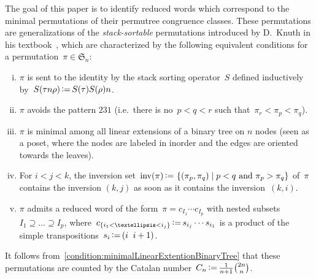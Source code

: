 \documentclass[11pt]{article}
\theoremstyle{definition}
\providecommand{\ie}{i.e.\ }
\numberwithin{equation}{section}
\newcommand{\fS}{\mathfrak{S}}
\newcommand{\set}[2]{\left\{ #1 \;\middle|\; #2 \right\}}
\newcommand{\eqdef}{\mbox{\,\raisebox{0.2ex}{\scriptsize\ensuremath{\mathrm:}}\ensuremath{=}\,}}
\newcommand{\defn}[1]{\textsl{\color{darkblue} #1}}
\DeclareMathOperator{\inv}{inv}
\begin{document}
The goal of this paper is to identify reduced words which correspond to the minimal permutations of their permutree congruence classes.
These permutations are generalizations of the \defn{stack-sortable} permutations introduced by D.~Knuth in his textbook~\cite[Sect.~2.2.1]{Knuth-TAOCP1}, which are characterized by the following equivalent conditions for a permutation~$\pi \in \fS_n$:
\begin{enumerate}[(i)]
\item \label{condition:stackSorting}
$\pi$ is sent to the identity by the stack sorting operator~$S$ defined inductively by~$S(\tau n \rho) \eqdef S(\tau) S(\rho) n$.
\item \label{condition:patternStack}
$\pi$ avoids the pattern $231$ (\ie there is no~$p < q < r$ such that~$\pi_r < \pi_p < \pi_q$).
\item \label{condition:minimalLinearExtentionBinaryTree}
$\pi$ is minimal among all linear extensions of a binary tree on $n$ nodes (seen as a poset, where the nodes are labeled in inorder and the edges are oriented towards the leaves).
\item \label{condition:alignedStack}
For $i < j < k$, the inversion set~$\inv(\pi) \eqdef \set{(\pi_p, \pi_q)}{p < q \text{ and } \pi_p > \pi_q}$ of~$\pi$ contains the inversion $(k,j)$ as soon as it contains the inversion~$(k,i)$.
\item \label{condition:sortableStack}
$\pi$ admits a reduced word of the form~$\pi = c_{I_1} \cdots c_{I_p}$ with nested subsets ${I_1 \supseteq \dots \supseteq I_p}$, where~$c_{\{i_1 < \dots < i_j\}} \eqdef s_{i_j} \cdots s_{i_1}$ is a product of the simple transpositions~$s_i \eqdef (i \;\; i+1)$.
\end{enumerate}
It follows from~\ref{condition:minimalLinearExtentionBinaryTree} that these permutations are counted by the Catalan number~$C_n \eqdef \frac{1}{n+1} \binom{2n}{n}$.
\end{document}
